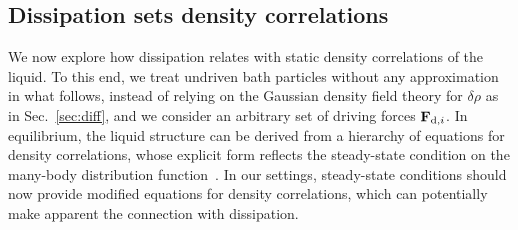 \documentclass[superscriptaddress, twocolumn, prx, longbibliography, nofootinbib]{revtex4-1}
\begin{document}


\subsection{Dissipation sets density correlations}\label{sec:struc}

We now explore how dissipation relates with static density correlations of the liquid. To this end, we treat undriven bath particles without any approximation in what follows, instead of relying on the Gaussian density field theory for $\delta\rho$ as in Sec.~\ref{sec:diff}, and we consider an arbitrary set of driving forces ${\bf F}_{{\rm d},i}$. In equilibrium, the liquid structure can be derived from a hierarchy of equations for density correlations, whose explicit form reflects the steady-state condition on the many-body distribution function~\cite{Hansen2013}. In our settings, steady-state conditions should now provide modified equations for density correlations, which can potentially make apparent the connection with dissipation.
\end{document}
